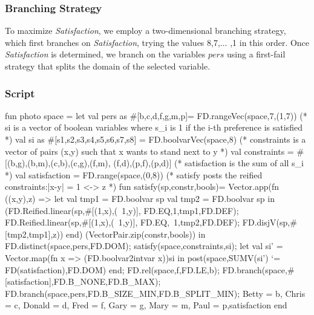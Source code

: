 \documentclass[a4paper]{scrartcl}
\begin{document}
\subsubsection{Branching Strategy}
To maximize {\it Satisfaction}, we employ a two-dimensional branching 
strategy, which first branches on {\it Satisfaction}, trying the values 
8,7,$ \ldots $ ,1 in this order. Once {\it Satisfaction} is determined, we 
branch on the variables $pers$ using a first-fail strategy that splits 
the domain of the selected variable.

\subsubsection{Script}
\begin{myverbatim}
fun photo space =
   let 
       val pers as #[b,c,d,f,g,m,p]= FD.rangeVec(space,7,(1,7))
      (* si is a vector of boolean variables where s_i is 1 
         if the i-th preference is satisfied *)
       val si as #[s1,s2,s3,s4,s5,s6,s7,s8] = FD.boolvarVec(space,8)
      (* constraints is a vector of pairs (x,y) such that x wants to
         stand next to y *)
       val constraints = #[(b,g),(b,m),(c,b),(c,g),(f,m),
                           (f,d),(p,f),(p,d)]
      (* satisfaction is the sum of all s_i *)
       val satisfaction = FD.range(space,(0,8))
      (* satisfy posts the reified constraints:|x-y| = 1 <-> z *)
       fun satisfy(sp,constr,bools)= Vector.app(fn ((x,y),z) =>
              let
                  val tmp1 = FD.boolvar sp
                  val tmp2 = FD.boolvar sp
              in
                 (FD.Reified.linear(sp,#[(1,x),(~1,y)],
                                    FD.EQ,1,tmp1,FD.DEF);
                  FD.Reified.linear(sp,#[(1,x),(~1,y)],
                                    FD.EQ,~1,tmp2,FD.DEF);
                  FD.disjV(sp,#[tmp2,tmp1],z))
              end)
                 (VectorPair.zip(constr,bools))
   in
       FD.distinct(space,pers,FD.DOM);
       satisfy(space,constraints,si);
       let 
           val si' = Vector.map(fn x => (FD.boolvar2intvar x))si
       in
           post(space,SUMV(si') `= FD(satisfaction),FD.DOM)
       end;
       FD.rel(space,f,FD.LE,b);
       FD.branch(space,#[satisfaction],FD.B_NONE,FD.B_MAX);
       FD.branch(space,pers,FD.B_SIZE_MIN,FD.B_SPLIT_MIN);
      {Betty = b, Chris = c, Donald = d, Fred = f,
       Gary = g, Mary = m, Paul = p,satisfaction}  
  end
\end{myverbatim}
\end{document}
